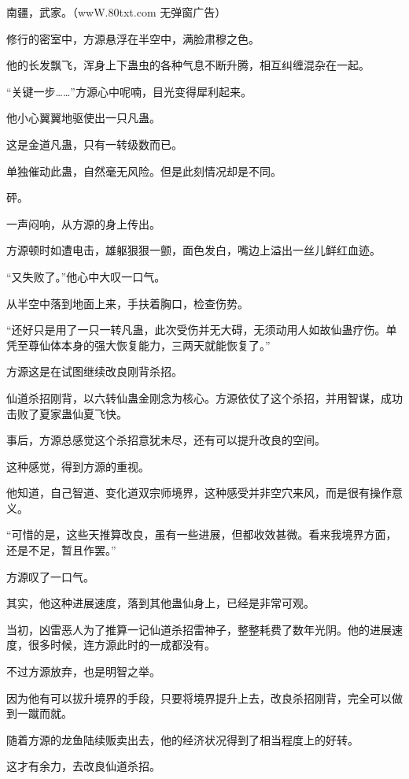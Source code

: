 
\begin{this_body}

南疆，武家。（wwW.80txt.com 无弹窗广告）

修行的密室中，方源悬浮在半空中，满脸肃穆之色。

他的长发飘飞，浑身上下蛊虫的各种气息不断升腾，相互纠缠混杂在一起。

“关键一步……”方源心中呢喃，目光变得犀利起来。

他小心翼翼地驱使出一只凡蛊。

这是金道凡蛊，只有一转级数而已。

单独催动此蛊，自然毫无风险。但是此刻情况却是不同。

砰。

一声闷响，从方源的身上传出。

方源顿时如遭电击，雄躯狠狠一颤，面色发白，嘴边上溢出一丝儿鲜红血迹。

“又失败了。”他心中大叹一口气。

从半空中落到地面上来，手扶着胸口，检查伤势。

“还好只是用了一只一转凡蛊，此次受伤并无大碍，无须动用人如故仙蛊疗伤。单凭至尊仙体本身的强大恢复能力，三两天就能恢复了。”

方源这是在试图继续改良刚背杀招。

仙道杀招刚背，以六转仙蛊金刚念为核心。方源依仗了这个杀招，并用智谋，成功击败了夏家蛊仙夏飞快。

事后，方源总感觉这个杀招意犹未尽，还有可以提升改良的空间。

这种感觉，得到方源的重视。

他知道，自己智道、变化道双宗师境界，这种感受并非空穴来风，而是很有操作意义。

“可惜的是，这些天推算改良，虽有一些进展，但都收效甚微。看来我境界方面，还是不足，暂且作罢。”

方源叹了一口气。

其实，他这种进展速度，落到其他蛊仙身上，已经是非常可观。

当初，凶雷恶人为了推算一记仙道杀招雷神子，整整耗费了数年光阴。他的进展速度，很多时候，连方源此时的一成都没有。

不过方源放弃，也是明智之举。

因为他有可以拔升境界的手段，只要将境界提升上去，改良杀招刚背，完全可以做到一蹴而就。

随着方源的龙鱼陆续贩卖出去，他的经济状况得到了相当程度上的好转。

这才有余力，去改良仙道杀招。


\end{this_body}
